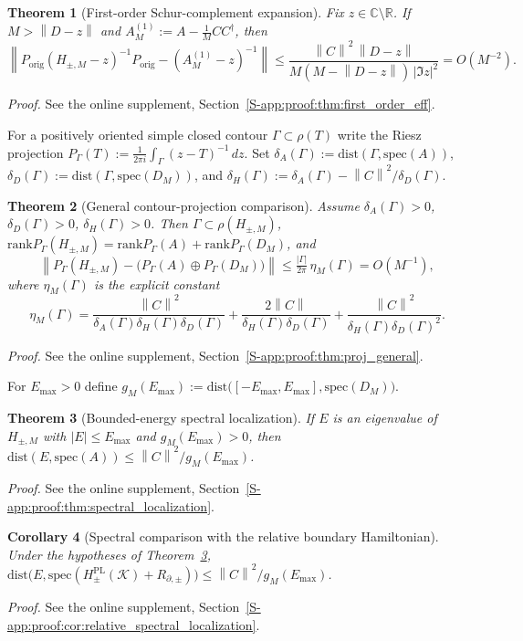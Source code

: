 \documentclass[11pt]{article}
\numberwithin{equation}{section}
\newtheorem{theorem}{Theorem}[section]
\newtheorem{corollary}[theorem]{Corollary}
\theoremstyle{definition}
\theoremstyle{remark}
\newcommand{\proofsuppref}[1]{%
  \par\noindent\emph{Proof.} See the online supplement, Section~\ref{S-#1}.\par\medskip
}
\newcommand{\K}{\mathcal{K}}
\newcommand{\spec}{\mathrm{spec}}
\newcommand{\dist}{\mathrm{dist}}
\newcommand{\rank}{\mathrm{rank}}
\newcommand{\opnorm}[1]{\left\lVert#1\right\rVert}
\begin{document}
\begin{theorem}[First-order Schur-complement expansion]\label{thm:first_order_eff}
Fix $z\in\mathbb C\setminus\mathbb R$. If $M>\opnorm{D-z}$ and $A_M^{(1)}:=A-\frac1MCC^\dagger$,
then
\begin{equation}\label{eq:first_order_bound}
\opnorm{P_{\mathrm{orig}}(H_{\pm,M}-z)^{-1}P_{\mathrm{orig}}-(A_M^{(1)}-z)^{-1}}
\le
\frac{\opnorm{C}^2\,\opnorm{D-z}}{M(M-\opnorm{D-z})\,|\Im z|^2}=O(M^{-2}).
\end{equation}
\end{theorem}
\proofsuppref{app:proof:thm:first_order_eff}

For a positively oriented simple closed contour $\Gamma\subset\rho(T)$ write the Riesz projection
$P_\Gamma(T):=\frac{1}{2\pi i}\int_\Gamma (z-T)^{-1}\,dz$. Set
$\delta_A(\Gamma):=\dist(\Gamma,\spec(A))$,
$\delta_D(\Gamma):=\dist(\Gamma,\spec(D_M))$, and
$\delta_H(\Gamma):=\delta_A(\Gamma)-\opnorm{C}^2/\delta_D(\Gamma)$.

\begin{theorem}[General contour-projection comparison]\label{thm:proj_general}
Assume $\delta_A(\Gamma)>0$, $\delta_D(\Gamma)>0$, $\delta_H(\Gamma)>0$. Then
$\Gamma\subset\rho(H_{\pm,M})$,
$\rank P_\Gamma(H_{\pm,M})=\rank P_\Gamma(A)+\rank P_\Gamma(D_M)$, and
\begin{equation}\label{eq:proj_general_bound}
\opnorm{P_\Gamma(H_{\pm,M})-\bigl(P_\Gamma(A)\oplus P_\Gamma(D_M)\bigr)}
\le \tfrac{|\Gamma|}{2\pi}\,\eta_M(\Gamma)=O(M^{-1}),
\end{equation}
where $\eta_M(\Gamma)$ is the explicit constant
\[
\eta_M(\Gamma)
=\frac{\opnorm C^2}{\delta_A(\Gamma)\delta_H(\Gamma)\delta_D(\Gamma)}
+\frac{2\opnorm C}{\delta_H(\Gamma)\delta_D(\Gamma)}
+\frac{\opnorm C^2}{\delta_H(\Gamma)\delta_D(\Gamma)^2}.
\]
\end{theorem}
\proofsuppref{app:proof:thm:proj_general}

For $E_{\max}>0$ define $g_M(E_{\max}):=\dist\bigl([-E_{\max},E_{\max}],\spec(D_M)\bigr)$.

\begin{theorem}[Bounded-energy spectral localization]\label{thm:spectral_localization}
If $E$ is an eigenvalue of $H_{\pm,M}$ with $|E|\le E_{\max}$ and $g_M(E_{\max})>0$, then
$\dist(E,\spec(A))\le\opnorm{C}^2/g_M(E_{\max})$.
\end{theorem}
\proofsuppref{app:proof:thm:spectral_localization}

\begin{corollary}[Spectral comparison with the relative boundary Hamiltonian]\label{cor:relative_spectral_localization}
Under the hypotheses of Theorem~\ref{thm:spectral_localization},
\(\dist\bigl(E,\spec(H^{\mathrm{PL}}_\pm(\K)+R_{\partial,\pm})\bigr)
\le\opnorm{C}^2/g_M(E_{\max})\).
\end{corollary}
\proofsuppref{app:proof:cor:relative_spectral_localization}
\end{document}
